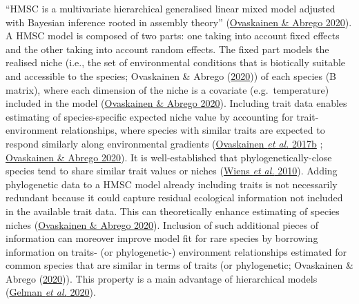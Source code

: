 \documentclass[9pt,biorxiv,doublespacing,lineno,endfloat]{lapreprint}
\begin{document}
``HMSC is a multivariate hierarchical generalised linear mixed model
adjusted with Bayesian inference rooted in assembly theory''
(\protect\hyperlink{ref-Ovaskainen_2020}{Ovaskainen \& Abrego 2020}). A
HMSC model is composed of two parts: one taking into account fixed
effects and the other taking into account random effects. The fixed part
models the realised niche (i.e., the set of environmental conditions
that is biotically suitable and accessible to the species; Ovaskainen \&
Abrego (\protect\hyperlink{ref-Ovaskainen_2020}{2020})) of each species
(B matrix), where each dimension of the niche is a covariate
(e.g.~temperature) included in the model
(\protect\hyperlink{ref-Ovaskainen_2020}{Ovaskainen \& Abrego 2020}).
Including trait data enables estimating of species-specific expected
niche value by accounting for trait-environment relationships, where
species with similar traits are expected to respond similarly along
environmental gradients
(\protect\hyperlink{ref-Ovaskainen_2017a}{Ovaskainen \emph{et al.}
2017b} ; \protect\hyperlink{ref-Ovaskainen_2020}{Ovaskainen \& Abrego
2020}). It is well-established that phylogenetically-close species tend
to share similar trait values or niches
(\protect\hyperlink{ref-Wiens_2010}{Wiens \emph{et al.} 2010}). Adding
phylogenetic data to a HMSC model already including traits is not
necessarily redundant because it could capture residual ecological
information not included in the available trait data. This can
theoretically enhance estimating of species niches
(\protect\hyperlink{ref-Ovaskainen_2020}{Ovaskainen \& Abrego 2020}).
Inclusion of such additional pieces of information can moreover improve
model fit for rare species by borrowing information on traits- (or
phylogenetic-) environment relationships estimated for common species
that are similar in terms of traits (or phylogenetic; Ovaskainen \&
Abrego (\protect\hyperlink{ref-Ovaskainen_2020}{2020})). This property
is a main advantage of hierarchical models
(\protect\hyperlink{ref-Gelman_2020}{Gelman \emph{et al.} 2020}).
\end{document}
